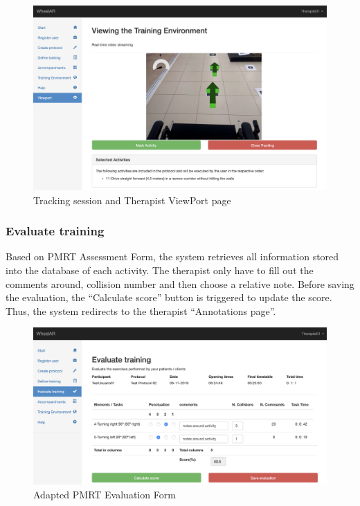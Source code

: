 \begin{figure}[!hbt]
\begin{center}
\includegraphics[width=1\linewidth]{img/apendiceD/tViewPortTherapist}
\caption{Tracking session and Therapist ViewPort page} \label{fig:apDtViewPortTherapist}
\end{center}
\end{figure}


\subsubsection{Evaluate training}

Based on PMRT Assessment Form, the system retrieves all information stored into the database of each activity. The therapist only have to fill out the comments around, collision number and then choose a relative note. Before saving the evaluation, the ``Calculate score'' button is triggered to update the score. Thus, the system redirects to the therapist ``Annotations page''.  

\begin{figure}[!hbt]
\begin{center}
\includegraphics[width=1\linewidth]{img/apendiceD/tEvaluateTraining}
\caption{Adapted PMRT Evaluation Form} \label{fig:apDtEvaluateTraining}
\end{center}
\vspace{-15pt}
\end{figure}


